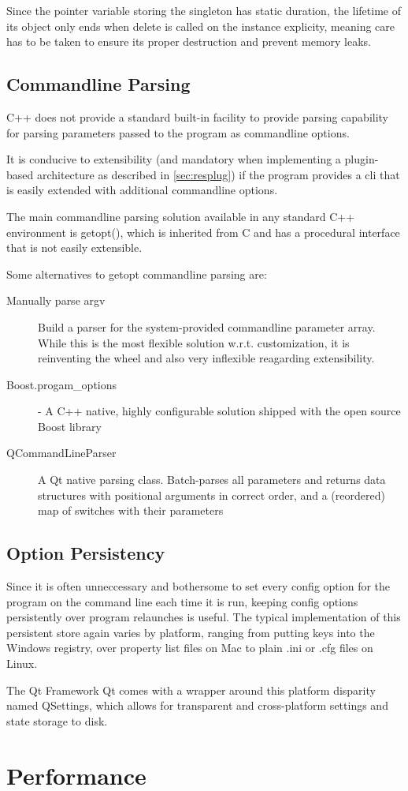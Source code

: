 Since the pointer variable storing the singleton has static duration, the lifetime of its object only ends when delete is called on the instance explicity, meaning care has to be taken to ensure its proper destruction and prevent memory leaks.

\subsection{Commandline Parsing}
C++ does not provide a standard built-in facility to provide parsing capability for parsing parameters passed to the program as commandline options.

It is conducive to extensibility (and mandatory when implementing a plugin-based architecture as described in \ref{sec:resplug}) if the program provides a \gls{cli} that is easily extended with additional commandline options.

The main commandline parsing solution available in any standard C++ environment is getopt(), which is inherited from C and has a procedural interface that is not easily extensible.

Some alternatives to getopt commandline parsing are:
\begin{description}
\item [Manually parse argv] Build a parser for the system-provided commandline parameter array. While this is the most flexible solution w.r.t. customization, it is reinventing the wheel and also very inflexible reagarding extensibility.
\item [Boost.progam\_options] - A C++ native, highly configurable solution shipped with the open source Boost library
\item [QCommandLineParser] A Qt native parsing class. Batch-parses all parameters and returns data structures with positional arguments in correct order, and a (reordered) map of switches with their parameters
\end{description}



\subsection{Option Persistency}
Since it is often unneccessary and bothersome to set every config option for the program on the command line each time it is run, keeping config options persistently over program relaunches is useful. The typical implementation of this persistent store again varies by platform, ranging from putting keys into the Windows registry, over property list files on Mac to plain .ini or .cfg files on Linux.

The Qt Framework Qt comes with a wrapper around this platform disparity named QSettings, which allows for transparent and cross-platform settings and state storage to disk.

\section{Performance}
